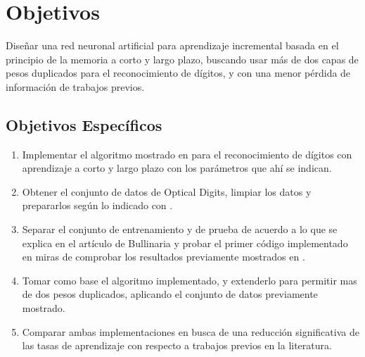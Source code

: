 \chapter{Objetivos}
    Diseñar una red neuronal artificial para aprendizaje incremental basada en el principio de la memoria a corto y largo plazo, buscando usar más de dos capas de pesos duplicados para el reconocimiento de dígitos, y con una menor p\'erdida de información de trabajos previos.
    \section{Objetivos Específicos}
        \begin{enumerate}
            \item Implementar el algoritmo mostrado en \cite{bullinaria2009} para el reconocimiento de dígitos con aprendizaje a corto y largo plazo con los parámetros que ahí se indican.
            \item Obtener el conjunto de datos de Optical Digits, limpiar los datos y prepararlos según lo indicado con \cite{bullinaria2009}.
            \item Separar el conjunto de entrenamiento y de prueba de acuerdo a lo que se explica en el artículo de Bullinaria y probar el primer código implementado en miras de comprobar los resultados previamente mostrados en \cite{bullinaria2009}.
            \item Tomar como base el algoritmo implementado, y extenderlo para permitir mas de dos pesos duplicados, aplicando el conjunto de datos previamente mostrado.
            \item Comparar ambas implementaciones en busca de una reducción significativa de las tasas de aprendizaje con respecto a trabajos previos en la literatura.
        \end{enumerate}